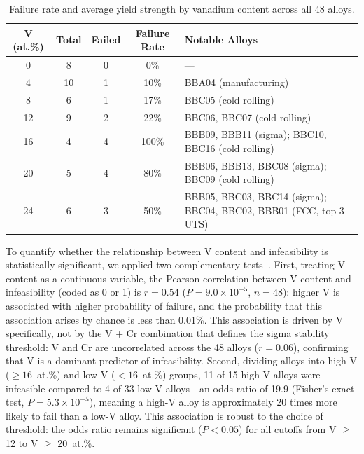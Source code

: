 \begin{table}[t]
\centering
\caption{Failure rate and average yield strength by vanadium content across all 48 alloys.}
\label{tab:v_failure}
\small
\begin{tabular}{ccccp{}}
\toprule
\textbf{V (at.\%)} & \textbf{Total} & \textbf{Failed} & \textbf{Failure Rate} & \textbf{Notable Alloys} \\
\midrule
0  & 8  & 0 & 0\%   & --- \\
4  & 10 & 1 & 10\%  & BBA04 (manufacturing) \\
8  & 6  & 1 & 17\%  & BBC05 (cold rolling) \\
12 & 9  & 2 & 22\%  & BBC06, BBC07 (cold rolling) \\
16 & 4  & 4 & 100\% & BBB09, BBB11 (sigma); BBC10, BBC16 (cold rolling) \\
20 & 5  & 4 & 80\%  & BBB06, BBB13, BBC08 (sigma); BBC09 (cold rolling) \\
24 & 6  & 3 & 50\%  & BBB05, BBC03, BBC14 (sigma); BBC04, BBC02, BBB01 (FCC, top 3 UTS) \\
\bottomrule
\end{tabular}
\end{table}

To quantify whether the relationship between V content and infeasibility is statistically significant, we applied two complementary tests~\cite{virtanen2020scipy}. First, treating V content as a continuous variable, the Pearson correlation between V content and infeasibility (coded as 0 or 1) is $r = 0.54$ ($P = 9.0 \times 10^{-5}$, $n = 48$): higher V is associated with higher probability of failure, and the probability that this association arises by chance is less than 0.01\%. This association is driven by V specifically, not by the V + Cr combination that defines the sigma stability threshold: V and Cr are uncorrelated across the 48 alloys ($r = 0.06$), confirming that V is a dominant predictor of infeasibility. Second, dividing alloys into high-V ($\geq 16$~at.\%) and low-V ($< 16$~at.\%) groups, 11 of 15 high-V alloys were infeasible compared to 4 of 33 low-V alloys---an odds ratio of 19.9 (Fisher's exact test, $P = 5.3 \times 10^{-5}$), meaning a high-V alloy is approximately 20 times more likely to fail than a low-V alloy. This association is robust to the choice of threshold: the odds ratio remains significant ($P < 0.05$) for all cutoffs from V $\geq$ 12 to V $\geq$ 20~at.\%.

